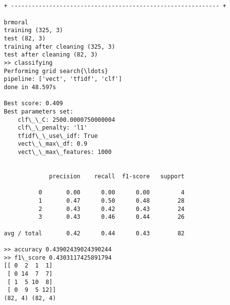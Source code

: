 \documentclass[11pt]{article}
\begin{document}
    \begin{Verbatim}[commandchars=\\\{\}]


+ ------------------------------------------------------------ +

brmoral
training (325, 3)
test (82, 3)
training after cleaning (325, 3)
test after cleaning (82, 3)
>> classifying
Performing grid search{\ldots}
pipeline: ['vect', 'tfidf', 'clf']
done in 48.597s

Best score: 0.409
Best parameters set:
	clf\_\_C: 2500.0000750000004
	clf\_\_penalty: 'l1'
	tfidf\_\_use\_idf: True
	vect\_\_max\_df: 0.9
	vect\_\_max\_features: 1000


             precision    recall  f1-score   support

          0       0.00      0.00      0.00         4
          1       0.47      0.50      0.48        28
          2       0.43      0.42      0.43        24
          3       0.43      0.46      0.44        26

avg / total       0.42      0.44      0.43        82

>> accuracy 0.43902439024390244
>> f1\_score 0.4303117425891794
[[ 0  2  1  1]
 [ 0 14  7  7]
 [ 1  5 10  8]
 [ 0  9  5 12]]
(82, 4) (82, 4)

    \end{Verbatim}

    \begin{center}
    \end{center}
    { \hspace*{\fill} \\}
    
    \begin{center}
    \end{center}
    { \hspace*{\fill} \\}
    
\end{document}
